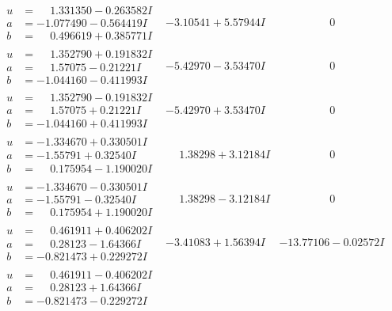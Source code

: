 \documentclass[1p]{elsarticle_modified}
\theoremstyle{definition}
\begin{document}
$$\begin{array}{c|c|c}
\begin{aligned}
u &= \phantom{-}1.331350 - 0.263582 I \\
a &= -1.077490 - 0.564419 I \\
b &= \phantom{-}0.496619 + 0.385771 I\end{aligned}
 & -3.10541 + 5.57944 I & \phantom{-0.000000 } 0 \\ \hline\begin{aligned}
u &= \phantom{-}1.352790 + 0.191832 I \\
a &= \phantom{-}1.57075 - 0.21221 I \\
b &= -1.044160 - 0.411993 I\end{aligned}
 & -5.42970 - 3.53470 I & \phantom{-0.000000 } 0 \\ \hline\begin{aligned}
u &= \phantom{-}1.352790 - 0.191832 I \\
a &= \phantom{-}1.57075 + 0.21221 I \\
b &= -1.044160 + 0.411993 I\end{aligned}
 & -5.42970 + 3.53470 I & \phantom{-0.000000 } 0 \\ \hline\begin{aligned}
u &= -1.334670 + 0.330501 I \\
a &= -1.55791 + 0.32540 I \\
b &= \phantom{-}0.175954 - 1.190020 I\end{aligned}
 & \phantom{-}1.38298 + 3.12184 I & \phantom{-0.000000 } 0 \\ \hline\begin{aligned}
u &= -1.334670 - 0.330501 I \\
a &= -1.55791 - 0.32540 I \\
b &= \phantom{-}0.175954 + 1.190020 I\end{aligned}
 & \phantom{-}1.38298 - 3.12184 I & \phantom{-0.000000 } 0 \\ \hline\begin{aligned}
u &= \phantom{-}0.461911 + 0.406202 I \\
a &= \phantom{-}0.28123 - 1.64366 I \\
b &= -0.821473 + 0.229272 I\end{aligned}
 & -3.41083 + 1.56394 I & -13.77106 - 0.02572 I \\ \hline\begin{aligned}
u &= \phantom{-}0.461911 - 0.406202 I \\
a &= \phantom{-}0.28123 + 1.64366 I \\
b &= -0.821473 - 0.229272 I\end{aligned}

\end{array}$$
\end{document}
